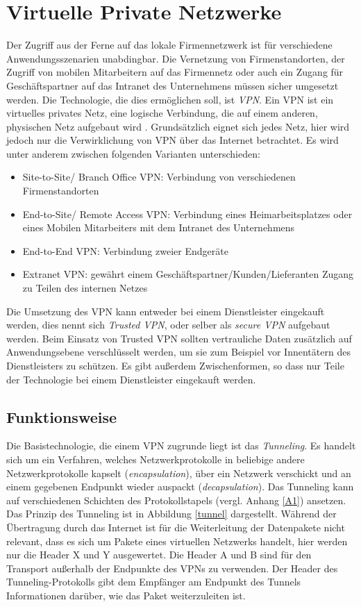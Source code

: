\chapter{Virtuelle Private Netzwerke}

Der Zugriff aus der Ferne auf das lokale Firmennetzwerk ist für verschiedene Anwendungsszenarien unabdingbar. Die Vernetzung von Firmenstandorten, der Zugriff von mobilen Mitarbeitern auf das Firmennetz oder auch ein Zugang für Geschäftspartner auf das Intranet des Unternehmens müssen sicher umgesetzt werden.
Die Technologie, die dies ermöglichen soll, ist \emph{VPN}. Ein VPN ist ein virtuelles privates Netz, eine logische Verbindung, die auf einem anderen, physischen Netz aufgebaut wird \cite{zisler2018computer}. Grundsätzlich eignet sich jedes Netz, hier wird jedoch nur die Verwirklichung von VPN über das Internet betrachtet. Es wird unter anderem zwischen folgenden Varianten unterschieden:
\begin{itemize}
  \item Site-to-Site/ Branch Office VPN: Verbindung von verschiedenen Firmenstandorten
  \item End-to-Site/ Remote Access VPN: Verbindung eines Heimarbeitsplatzes oder eines Mobilen Mitarbeiters mit dem Intranet des Unternehmens
  \item End-to-End VPN: Verbindung zweier Endgeräte
  \item Extranet VPN: gewährt einem Geschäftspartner/Kunden/Lieferanten Zugang zu Teilen des internen Netzes 
\end{itemize}

Die Umsetzung des VPN kann entweder bei einem Dienstleister eingekauft werden, dies nennt sich \emph{Trusted VPN}, oder selber als \emph{secure VPN} aufgebaut werden. Beim Einsatz von Trusted VPN sollten vertrauliche Daten zusätzlich auf Anwendungsebene verschlüsselt werden, um sie zum Beispiel vor Innentätern des Dienstleisters zu schützen. 
 Es gibt außerdem Zwischenformen, so dass nur Teile der Technologie bei einem Dienstleister eingekauft werden.


\section{Funktionsweise}

Die Basistechnologie, die einem VPN zugrunde liegt ist das \emph{Tunneling}. Es handelt sich um ein Verfahren, welches  Netzwerkprotokolle in beliebige andere Netzwerkprotokolle kapselt (\emph{encapsulation}), über ein Netzwerk verschickt und an einem gegebenen Endpunkt wieder auspackt (\emph{decapsulation}). Das Tunneling kann auf verschiedenen Schichten des Protokollstapels (vergl. Anhang \ref{A1}) ansetzen. Das Prinzip des Tunneling ist in Abbildung \ref{tunnel} dargestellt. Während der Übertragung durch das Internet ist für die Weiterleitung der Datenpakete nicht relevant, dass es sich um Pakete eines virtuellen Netzwerks handelt, hier werden nur die Header X und Y ausgewertet. Die Header A und B sind für den Transport außerhalb der Endpunkte des VPNs zu verwenden. Der Header des Tunneling-Protokolls gibt dem Empfänger am Endpunkt des Tunnels Informationen darüber, wie das Paket weiterzuleiten ist. 

